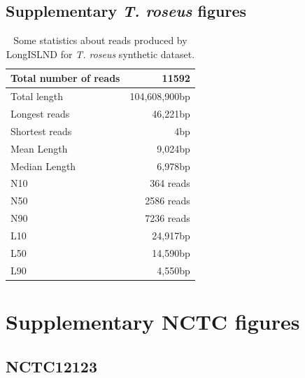 \documentclass[../../main.tex]{subfiles}
\begin{document}
\subsection*{Supplementary {\sl T. roseus} figures} 
\begin{table}[!hb]
\centering
\begin{tabular}{lr}
\hline
Total number of reads & 11592 \\
\hline
Total length & 104,608,900bp \\
\hline
Longest reads & 46,221bp \\
Shortest reads & 4bp \\
Mean Length & 9,024bp \\
Median Length & 6,978bp \\
\hline
N10 & 364 reads \\
N50 & 2586 reads \\
N90 & 7236 reads \\
\hline
L10 & 24,917bp \\
L50 & 14,590bp \\
L90 & 4,550bp \\
\hline
\end{tabular}
\caption{Some statistics about reads produced by LongISLND for \textit{T. roseus} synthetic dataset.}
\label{tb:appendix:t_roseus_20x}
\end{table}


\newpage

\section{Supplementary NCTC figures}



\subsection*{NCTC12123}
\end{document}
